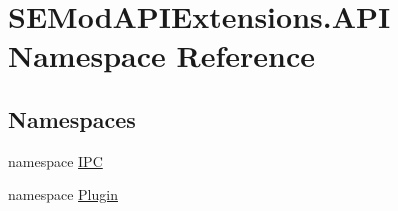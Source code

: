 \hypertarget{namespace_s_e_mod_a_p_i_extensions_1_1_a_p_i}{}\section{S\+E\+Mod\+A\+P\+I\+Extensions.\+A\+P\+I Namespace Reference}
\label{namespace_s_e_mod_a_p_i_extensions_1_1_a_p_i}
\subsection*{Namespaces}
\begin{DoxyCompactItemize}
\item 
namespace \hyperlink{namespace_s_e_mod_a_p_i_extensions_1_1_a_p_i_1_1_i_p_c}{I\+P\+C}
\item 
namespace \hyperlink{namespace_s_e_mod_a_p_i_extensions_1_1_a_p_i_1_1_plugin}{Plugin}
\end{DoxyCompactItemize}
